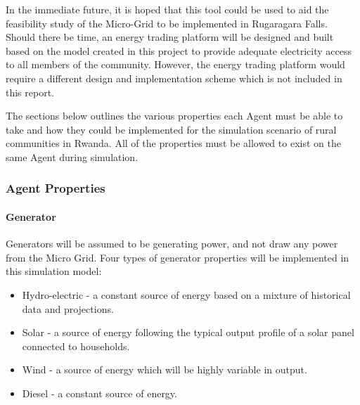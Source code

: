 In the immediate future, it is hoped that this tool could be used to aid the feasibility study of the Micro-Grid to be implemented in Rugaragara Falls. Should there be time, an energy trading platform will be designed and built based on the model created in this project to provide adequate electricity access to all members of the community. However, the energy trading platform would require a different design and implementation scheme which is not included in this report.

The sections below outlines the various properties each Agent must be able to take and how they could be implemented for the simulation scenario of rural communities in Rwanda. All of the properties must be allowed to exist on the same Agent during simulation.

\subsubsection{Agent Properties}

\paragraph{Generator}
Generators will be assumed to be generating power, and not draw any power from the Micro Grid. Four types of generator properties will be implemented in this simulation model: 

\begin{itemize}
  \item Hydro-electric - a constant source of energy based on a mixture of historical data and projections.
  \item Solar - a source of energy following the typical output profile of a solar panel connected to households.
  \item Wind - a source of energy which will be highly variable in output.
  \item Diesel - a constant source of energy.
\end{itemize}

